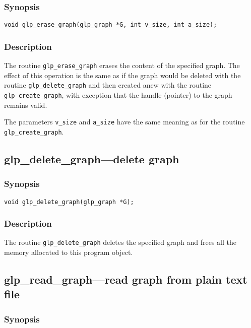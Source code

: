 \subsubsection*{Synopsis}

\begin{verbatim}
void glp_erase_graph(glp_graph *G, int v_size, int a_size);
\end{verbatim}

\subsubsection*{Description}

The routine \verb|glp_erase_graph| erases the content of the specified
graph. The effect of this operation is the same as if the graph would be
deleted with the routine \verb|glp_delete_graph| and then created anew
with the routine \verb|glp_create_graph|, with exception that the handle
(pointer) to the graph remains valid.

The parameters \verb|v_size| and \verb|a_size| have the same meaning as
for the routine \verb|glp_create_graph|.

\subsection{glp\_delete\_graph---delete graph}

\subsubsection*{Synopsis}

\begin{verbatim}
void glp_delete_graph(glp_graph *G);
\end{verbatim}

\subsubsection*{Description}

The routine \verb|glp_delete_graph| deletes the specified graph and
frees all the memory allocated to this program object.

\newpage

\subsection{glp\_read\_graph---read graph from plain text file}

\subsubsection*{Synopsis}

